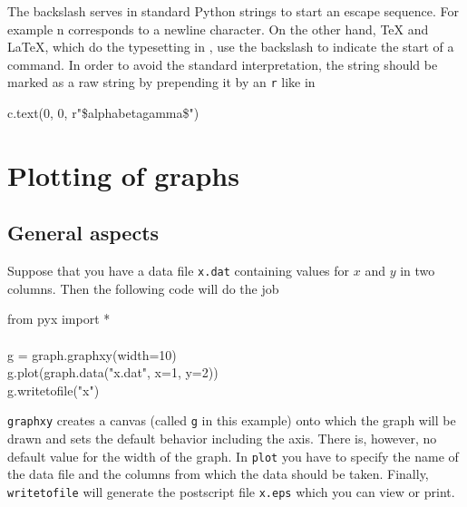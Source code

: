 \documentclass[11pt,DIV14]{scrartcl}
\begin{document}
{}
{\label{q:raw_string}

The backslash serves in standard Python strings to start an escape sequence.
For example {\cs n} corresponds to a newline character. On the other hand,
\TeX{} and \LaTeX{}, which do the typesetting in \PyX, use the backslash to
indicate the start of a command. In order to avoid the standard interpretation,
the string should be marked as a raw string by prepending it by an \texttt{r} 
like in
\begin{progcode}
c.text(0, 0, r"\${\cs alpha}{\cs beta}{\cs gamma}\$")
\end{progcode}
}

\section{Plotting of graphs}

\subsection{General aspects}

{}
{Suppose that you have a data file \texttt{x.dat} containing values for
$x$ and $y$ in two columns. Then the following code will do the job
\begin{progcode}
from pyx import *\\
\\
g = graph.graphxy(width=10)\\
g.plot(graph.data("x.dat", x=1, y=2))\\
g.writetofile("x")
\end{progcode}
\texttt{graphxy} creates a canvas (called \texttt{g} in this example) onto 
which the graph will be drawn and sets the default behavior including the 
axis. There is, however, no default value for the width of the graph. In 
\texttt{plot} you have to specify the name of the data file and the columns 
from which the data should be taken. Finally, \texttt{writetofile} will 
generate the postscript file \texttt{x.eps} which you can view or print.
}

{}
{}
\end{document}
